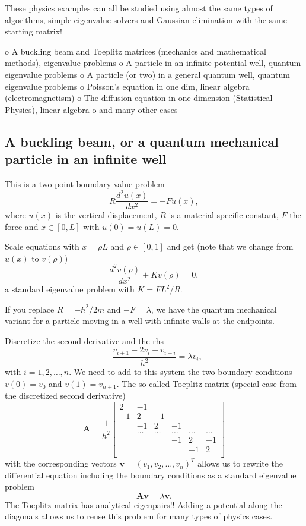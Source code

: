 These physics examples can all be studied using almost the same types of algorithms, simple eigenvalue solvers and Gaussian elimination with the same starting matrix!

 o A buckling beam and Toeplitz matrices (mechanics and mathematical methods), eigenvalue problems
 o A particle in an infinite potential well, quantum eigenvalue problems
 o A particle (or two) in a general quantum well, quantum eigenvalue problems
 o Poisson's  equation in one dim, linear algebra (electromagnetism)
 o The diffusion equation in one dimension (Statistical Physics), linear algebra
 o and many other cases

\subsection{A buckling beam, or a quantum mechanical particle in an infinite well}
This is a two-point boundary value problem
\[
R \frac{d^2 u(x)}{dx^2} = -F u(x),
\]
where $u(x)$ is the vertical displacement, $R$ is a material specific constant, $F$ the force and $x \in [0,L]$ with $u(0)=u(L)=0$.

Scale equations with $x = \rho L$ and $\rho \in [0,1]$ and get (note that we change from $u(x)$ to $v(\rho)$) 
\[
\frac{d^2 v(\rho)}{dx^2} +K v(\rho)=0,
\]
a standard eigenvalue problem with $K= FL^2/R$.

If you replace $R=-\hbar^2/2m$ and $-F=\lambda$, we have the quantum mechanical variant for a particle moving in a well with infinite walls at the endpoints.

Discretize the second derivative and the rhs
\[
    -\frac{v_{i+1} -2v_i +v_{i-i}}{h^2}=\lambda v_i,
\]
with $i=1,2,\dots, n$. We need to add to this system the two boundary conditions $v(0) =v_0$ and $v(1) = v_{n+1}$.
The so-called Toeplitz matrix (special case from the discretized second derivative)
\[
    \mathbf{A} = \frac{1}{h^2}\begin{bmatrix}
                          2 & -1 &  &   &  & \\
                          -1 & 2 & -1 & & & \\
                           & -1 & 2 & -1 & &  \\
                           & \dots   & \dots &\dots   &\dots & \dots \\
                           &   &  &-1  &2& -1 \\
                           &    &  &   &-1 & 2 \\
                      \end{bmatrix}
\]
with the corresponding vectors $\mathbf{v} = (v_1, v_2, \dots,v_n)^T$ allows us to rewrite the differential equation
including the boundary conditions as a standard eigenvalue problem
\[
   \mathbf{A}\mathbf{v} = \lambda\mathbf{v}.
\]
The Toeplitz matrix has analytical eigenpairs!! Adding a potential along the diagonals allows us to reuse this problem for many types of physics cases.

